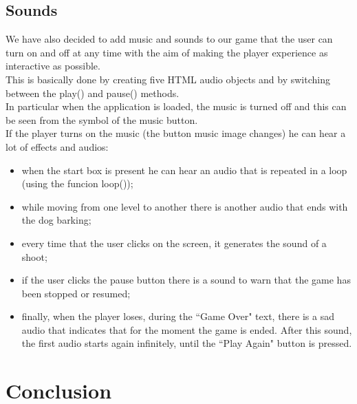 \documentclass[12pt,a4paper]{article}
\begin{document}
	\subsection{Sounds}
	We have also decided to add music and sounds to our game that the user can turn on and off at any time with the aim of making the player experience as interactive as possible.\\
	This is basically done by creating five HTML audio objects and by switching between the play() and pause() methods.\\
	In particular when the application is loaded, the music is turned off and this can be seen from the symbol of the music button.\\
	If the player turns on the music (the button music image changes) he can hear a lot of effects and audios:
	\begin{itemize}
		\item when the start box is present he can hear an audio that is repeated in a loop (using the funcion loop());
		\item while moving from one level to another there is another audio that ends with the dog barking;
		\item every time that the user clicks on the screen, it generates the sound of a shoot;
		\item if the user clicks the pause button there is a sound to warn that the game has been stopped or resumed;
		\item finally, when the player loses, during the ``Game Over" text, there is a sad audio that indicates that for the moment the game is ended. After this sound, the first audio starts again infinitely, until the ``Play Again" button is pressed.
	\end{itemize}
	
	
	\section{Conclusion}
	
	
\end{document}
